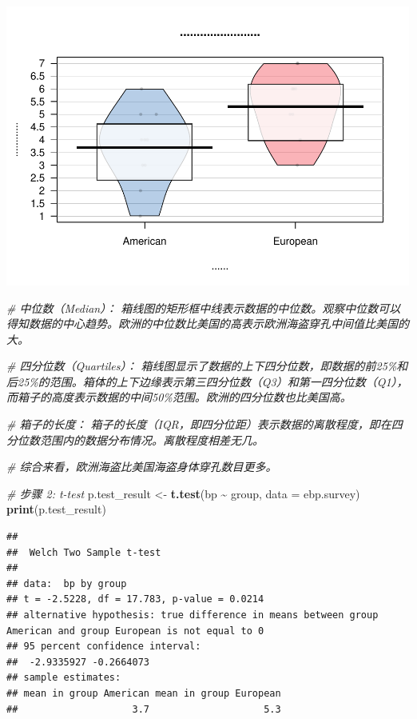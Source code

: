 \documentclass[
  hyperref,]{ctexart}
\newenvironment{Shaded}{\begin{snugshade}}{\end{snugshade}}
\newcommand{\AttributeTok}[1]{\textcolor[rgb]{0.13,0.29,0.53}{#1}}
\newcommand{\CommentTok}[1]{\textcolor[rgb]{0.56,0.35,0.01}{\textit{#1}}}
\newcommand{\FunctionTok}[1]{\textcolor[rgb]{0.13,0.29,0.53}{\textbf{#1}}}
\newcommand{\NormalTok}[1]{#1}
\newcommand{\OtherTok}[1]{\textcolor[rgb]{0.56,0.35,0.01}{#1}}
\newcommand{\SpecialCharTok}[1]{\textcolor[rgb]{0.81,0.36,0.00}{\textbf{#1}}}
\begin{document}
\includegraphics{2151299_苏家铭_hw2_files/figure-latex/step1-1.pdf}

\begin{Shaded}
\begin{Highlighting}[]
\CommentTok{\# 中位数（Median）： 箱线图的矩形框中线表示数据的中位数。观察中位数可以得知数据的中心趋势。欧洲的中位数比美国的高表示欧洲海盗穿孔中间值比美国的大。}

\CommentTok{\# 四分位数（Quartiles）： 箱线图显示了数据的上下四分位数，即数据的前25\%和后25\%的范围。箱体的上下边缘表示第三四分位数（Q3）和第一四分位数（Q1），而箱子的高度表示数据的中间50\%范围。欧洲的四分位数也比美国高。}

\CommentTok{\# 箱子的长度： 箱子的长度（IQR，即四分位距）表示数据的离散程度，即在四分位数范围内的数据分布情况。离散程度相差无几。}

\CommentTok{\# 综合来看，欧洲海盗比美国海盗身体穿孔数目更多。}
\end{Highlighting}
\end{Shaded}

\begin{Shaded}
\begin{Highlighting}[]
\CommentTok{\# 步骤 2: t{-}test}
\NormalTok{p.test\_result }\OtherTok{\textless{}{-}} \FunctionTok{t.test}\NormalTok{(bp }\SpecialCharTok{\textasciitilde{}}\NormalTok{ group, }\AttributeTok{data =}\NormalTok{ ebp.survey)}
\FunctionTok{print}\NormalTok{(p.test\_result)}
\end{Highlighting}
\end{Shaded}

\begin{verbatim}
## 
##  Welch Two Sample t-test
## 
## data:  bp by group
## t = -2.5228, df = 17.783, p-value = 0.0214
## alternative hypothesis: true difference in means between group American and group European is not equal to 0
## 95 percent confidence interval:
##  -2.9335927 -0.2664073
## sample estimates:
## mean in group American mean in group European 
##                    3.7                    5.3
\end{verbatim}
\end{document}

